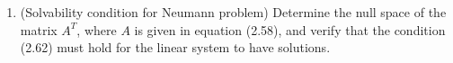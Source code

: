 \documentclass[letterpaper,12pt]{article}
\begin{document}
\begin{enumerate}
\begin{enumerate}
{\bf Solution:}


\[A = \begin{bmatrix}
        3. & -4. & 1. & 0. & 0.\\
        0.25 & -0.5 & 0.25 & 0. & 0.\\ 
        0. & 0.25 & -0.5 & 0.25 & 0.\\ 
        0. & 0. & 0.25 & -0.5 & 0.25\\ 
        0. & 0. & 0. & 0. & 1.\\
        \end{bmatrix} \]
        
\[A^{-1} =\begin{bmatrix}  2. & -20. & -8. & -4. & 1.\\  1.5 & -18. & -8. & -4. & 1.\\  1. & -12. & -8. & -4. & 1.\\  0.5 & -6. & -4. & -4. & 1.\\  0. & 0. & 0. & 0. & 1.\\

\end{bmatrix}\]

\end{enumerate}


\item (Solvability condition for Neumann problem)
Determine the null space of the matrix $A^T$, where $A$ is given in
equation (2.58), and verify that the condition (2.62) must hold for the
linear system to have solutions.


\end{enumerate}
\end{document}
